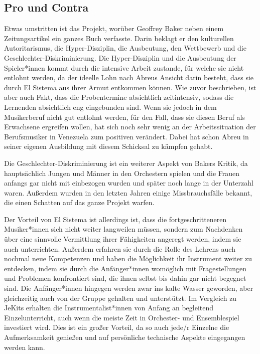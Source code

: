 \subsection{Pro und Contra}
Etwas umstritten ist das Projekt, worüber Geoffrey Baker neben einem
Zeitungsartikel ein ganzes Buch verfasste. Darin beklagt er den kulturellen
Autoritarismus, die Hyper-Disziplin, die Ausbeutung, den Wettbewerb und die
Geschlechter-Diskriminierung. Die Hyper-Disziplin und die Ausbeutung der
Spieler*innen kommt durch die intensive Arbeit zustande, für welche sie nicht
entlohnt werden, da der ideelle Lohn nach Abreus Ansicht darin besteht, dass sie
durch El Sistema aus ihrer Armut entkommen können. Wie zuvor beschrieben, ist
aber auch Fakt, dass die Probentermine absichtlich zeitintensiv, sodass die
Lernenden absichtlich eng eingebunden sind. Wenn sie jedoch in dem Musikerberuf
nicht gut entlohnt werden, für den Fall, dass sie diesen Beruf als Erwachsene
ergreifen wollen, hat sich noch sehr wenig an der Arbeitssituation der
Berufsmusiker in Venezuela zum positiven verändert. Dabei hat schon Abreu in
seiner eigenen Ausbildung mit diesem Schicksal zu kämpfen gehabt.

Die Geschlechter-Diskriminierung ist ein weiterer Aspekt von Bakers Kritik, da
hauptsächlich Jungen und Männer in den Orchestern spielen und die Frauen anfangs
gar nicht mit einbezogen wurden und später noch lange in der Unterzahl waren.
Außerdem wurden in den letzten Jahren einige Missbrauchsfälle bekannt, die einen
Schatten auf das ganze Projekt warfen. 

Der Vorteil von El Sistema ist allerdings ist, dass die fortgeschritteneren
Musiker*innen sich nicht weiter langweilen müssen, sondern zum Nachdenken über
eine sinnvolle Vermittlung ihrer Fähigkeiten angeregt werden, indem sie auch
unterrichten. Außerdem erfahren sie durch die Rolle des Lehrens auch nochmal
neue Kompetenzen und haben die Möglichkeit ihr Instrument weiter zu entdecken,
indem sie durch die Anfänger*innen womöglich mit Fragestellungen und Problemen
konfrontiert sind, die ihnen selbst bis dahin gar nicht begegnet sind. Die
Anfänger*innen hingegen werden zwar ins kalte Wasser geworden, aber gleichzeitig
auch von der Gruppe gehalten und unterstützt.
\autocite[160]{roebke_mantilla:vom_wilden_lernen}
Im Vergleich zu JeKits erhalten die Instrumentalist*innen von Anfang an
begleitend Einzelunterricht, auch wenn die meiste Zeit in Orchester- und
Ensemblespiel investiert wird. Dies ist ein großer Vorteil, da so auch jede/r
Einzelne die Aufmerksamkeit genießen und auf persönliche technische Aspekte
eingegangen werden kann. 
